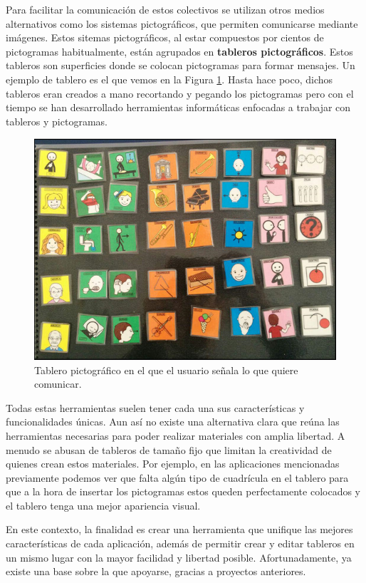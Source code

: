 Para facilitar la comunicación de estos colectivos se utilizan otros medios alternativos como los sistemas pictográficos, que permiten comunicarse mediante imágenes. Estos sitemas pictográficos, al estar compuestos por cientos de pictogramas habitualmente, están agrupados en \textbf{tableros pictográficos}. Estos tableros son superficies donde se colocan pictogramas para formar mensajes. Un ejemplo de tablero es el que vemos en la Figura \ref{fig:tablerofisico}. Hasta hace poco, dichos tableros eran creados a mano recortando y pegando los pictogramas pero con el tiempo se han desarrollado herramientas informáticas enfocadas a trabajar con tableros y pictogramas.

\begin{figure}[h!]
	\centering
	\includegraphics[width=0.7\linewidth]{Imagenes/Bitmap/tablerofisico}
	\caption{Tablero pictográfico en el que el usuario señala lo que quiere comunicar.}
	\label{fig:tablerofisico}
\end{figure}

Todas estas herramientas suelen tener cada una  sus características y funcionalidades únicas. Aun así no existe una alternativa clara que reúna las herramientas necesarias para poder realizar materiales con amplia libertad. A menudo se abusan de tableros de tamaño fijo que limitan la creatividad de quienes crean estos materiales. Por ejemplo, en las aplicaciones mencionadas previamente podemos ver que falta algún tipo de cuadrícula en el tablero para que a la hora de insertar los pictogramas estos queden perfectamente colocados y el tablero tenga una mejor apariencia visual.

En este contexto, la finalidad es crear una herramienta que unifique las mejores características de cada aplicación, además de permitir crear y editar tableros en un mismo lugar con la mayor facilidad y libertad posible. Afortunadamente, ya existe una base sobre la que apoyarse, gracias a proyectos anteriores.







